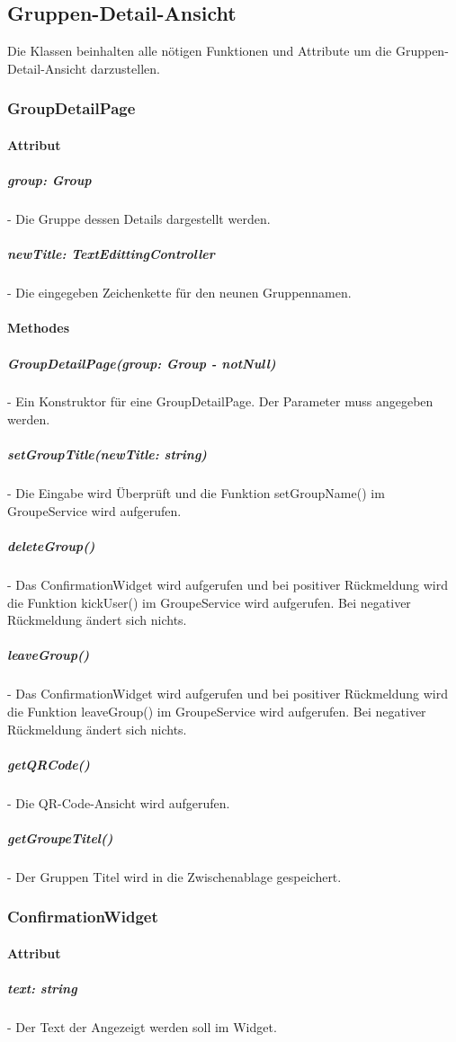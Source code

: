 \documentclass[parskip=full]{scrartcl}
\begin{document}
    \newpage

\subsection{Gruppen-Detail-Ansicht}
    Die Klassen beinhalten alle nötigen Funktionen und Attribute um die Gruppen-Detail-Ansicht darzustellen.

    \subsubsection{GroupDetailPage}
        \paragraph*{Attribut}
            \subparagraph*{group: Group} - Die Gruppe dessen Details dargestellt werden.
            \subparagraph*{newTitle: TextEdittingController} - Die eingegeben Zeichenkette für den neunen Gruppennamen.

        \paragraph*{Methodes}
            \subparagraph*{GroupDetailPage(group: Group - notNull)} - Ein Konstruktor für eine GroupDetailPage. Der Parameter muss angegeben werden. 
            \subparagraph*{setGroupTitle(newTitle: string)} - Die Eingabe wird Überprüft und die Funktion setGroupName() im GroupeService wird aufgerufen.
            \subparagraph*{deleteGroup()} - Das ConfirmationWidget wird aufgerufen und bei positiver Rückmeldung wird die Funktion kickUser() im GroupeService wird aufgerufen. Bei negativer Rückmeldung ändert sich nichts.
            \subparagraph*{leaveGroup()} - Das ConfirmationWidget wird aufgerufen und bei positiver Rückmeldung wird die Funktion leaveGroup() im GroupeService wird aufgerufen. Bei negativer Rückmeldung ändert sich nichts.
            \subparagraph*{getQRCode()} - Die QR-Code-Ansicht wird aufgerufen.
            \subparagraph*{getGroupeTitel()} - Der Gruppen Titel wird in die Zwischenablage gespeichert.


    \subsubsection{ConfirmationWidget}
        \paragraph*{Attribut}
            \subparagraph*{text: string} - Der Text der Angezeigt werden soll im Widget.
\end{document}
